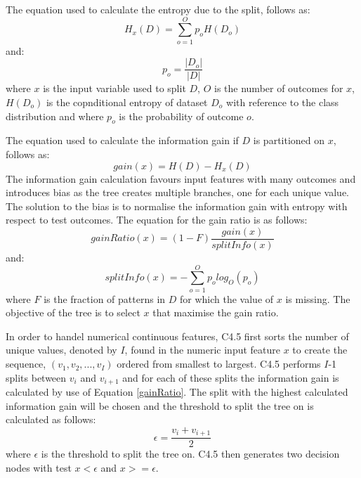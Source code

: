 \documentclass[10pt, conference]{IEEEtran}
\begin{document}
The equation used to calculate the entropy due to the split, follows as:
\begin{equation}
    H_x(D) = \sum_{o=1}^{O} p_o H(D_o)\label{entropy_x}
\end{equation}
and:
\begin{equation}
    p_o = \frac{\left\lvert D_o \right\rvert}{\left\lvert D \right\rvert}\label{o_prob}
\end{equation}
where $x$ is the input variable used to split $D$, $O$ is the number of outcomes for $x$, $H(D_o)$ is the copnditional entropy of dataset
$D_o$ with reference to the class distribution and where $p_o$ is the probability of outcome $o$.

The equation used to calculate the information gain if $D$ is partitioned on $x$, follows as:
\begin{equation}
    gain(x) = H(D) - H_x(D)\label{info_gain}
\end{equation}
The information gain calculation favours input features with many outcomes and introduces bias as the tree
creates multiple branches, one for each unique value. The solution to the bias is to normalise the information gain with entropy
with respect to test outcomes. The equation for the gain ratio is as follows:
\begin{equation}
    gainRatio(x) = (1-F)\frac{gain(x)}{splitInfo(x)}\label{gainRatio}
\end{equation}
and:
\begin{equation}
    splitInfo(x) = -\sum_{o=1}^{O}p_o log_O(p_o)\label{splitInfo}
\end{equation}
where $F$ is the fraction of patterns in $D$ for which the value of $x$ is missing.
The objective of the tree is to select $x$ that maximise the gain ratio.

In order to handel numerical continuous features, C4.5 first sorts the number of unique values, denoted by $I$,
found in the numeric input feature $x$ to create the sequence, $(v_1,v_2,...,v_I)$ ordered from smallest to largest.
C4.5 performs $I$-1 splits between $v_i$ and $v_{i+1}$ and for each of these splits the information gain is calculated by use of
Equation \eqref{gainRatio}. The split with the highest calculated information gain will be chosen and the threshold to
split the tree on is calculated as follows:
\begin{equation}
    \epsilon = \frac{v_i + v_{i+1}}{2}\label{numeric}
\end{equation}
where $\epsilon$ is the threshold to split the tree on. C4.5 then generates two decision nodes with test $x < \epsilon$ and $x >= \epsilon$.
\end{document}
